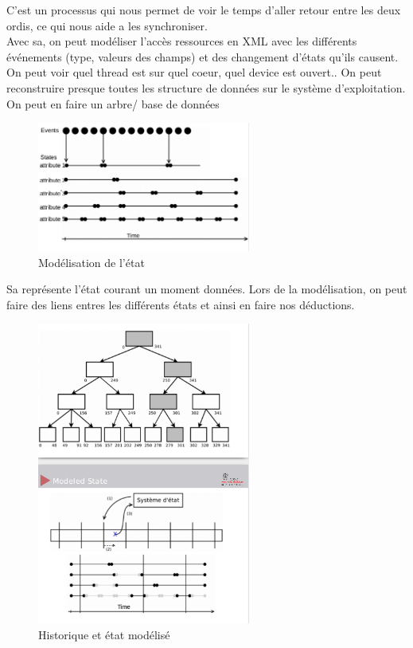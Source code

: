\documentclass[oneside]{book}
\begin{document}
C'est un processus qui nous permet de voir le temps d'aller retour entre les deux ordis, ce qui nous aide a les synchroniser.\\

Avec sa, on peut modéliser l'accès ressources en XML avec les différents événements (type, valeurs des champs) et des changement d'états qu'ils causent. On peut voir quel thread est sur quel coeur, quel device est ouvert.. On peut reconstruire presque toutes les structure de données sur le système d'exploitation. On peut en faire un arbre/ base de données\\

\begin{figure}[!ht]
\centering
\includegraphics[width = 7cm]{modelisation_etat.png}
\caption{Modélisation de l'état}
\end{figure}
Sa représente l'état courant un moment données. Lors de la modélisation, on peut faire des liens entres les différents états et ainsi en faire nos déductions. \\

\begin{figure}[!ht]
\centering
\includegraphics[width = 7cm]{53_55.png}
\caption{Historique et état modélisé}
\end{figure}
\end{document}
